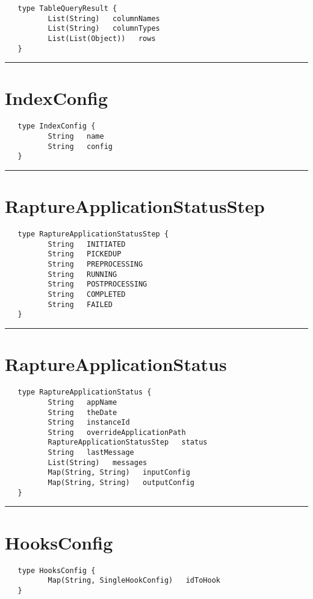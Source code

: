 \begin{verbatim}
   type TableQueryResult {
          List(String)   columnNames
          List(String)   columnTypes
          List(List(Object))   rows
   }
\end{verbatim}

\rule{15cm}{2pt}
\section{IndexConfig}
\label{type:IndexConfig}

\begin{verbatim}
   type IndexConfig {
          String   name
          String   config
   }
\end{verbatim}

\rule{15cm}{2pt}
\section{RaptureApplicationStatusStep}
\label{type:RaptureApplicationStatusStep}

\begin{verbatim}
   type RaptureApplicationStatusStep {
          String   INITIATED
          String   PICKEDUP
          String   PREPROCESSING
          String   RUNNING
          String   POSTPROCESSING
          String   COMPLETED
          String   FAILED
   }
\end{verbatim}

\rule{15cm}{2pt}
\section{RaptureApplicationStatus}
\label{type:RaptureApplicationStatus}

\begin{verbatim}
   type RaptureApplicationStatus {
          String   appName
          String   theDate
          String   instanceId
          String   overrideApplicationPath
          RaptureApplicationStatusStep   status
          String   lastMessage
          List(String)   messages
          Map(String, String)   inputConfig
          Map(String, String)   outputConfig
   }
\end{verbatim}

\rule{15cm}{2pt}
\section{HooksConfig}
\label{type:HooksConfig}

\begin{verbatim}
   type HooksConfig {
          Map(String, SingleHookConfig)   idToHook
   }
\end{verbatim}

